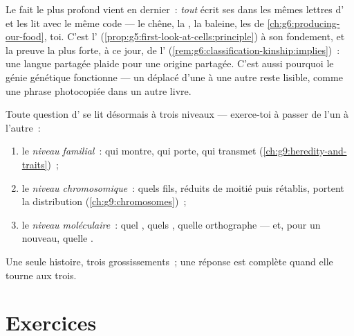 \begin{remark}\label{rem:g9:genes-and-dna:universal}
Le fait le plus profond vient en dernier~: \emph{tout}
 écrit ses  dans les mêmes lettres d' et
les lit avec le même code --- le chêne, la , la
baleine, les  de
\cref{ch:g6:producing-our-food}, toi. C'est l' (\cref{prop:g5:first-look-at-cells:principle}) à son
fondement, et la preuve la plus forte, à ce jour, de
l'
(\cref{rem:g6:classification-kinship:implies})~: une langue
partagée plaide pour une origine partagée. C'est aussi
pourquoi le génie génétique fonctionne --- un  déplacé
d'une  à une autre reste lisible, comme une phrase
photocopiée dans un autre livre.
\end{remark}

\begin{method}\label{met:g9:genes-and-dna:levels}
Toute question d' se lit désormais à trois niveaux
--- exerce-toi à passer de l'un à l'autre~:
\begin{enumerate}
  \item le \emph{niveau familial}~: qui montre, qui porte,
        qui transmet (\cref{ch:g9:heredity-and-traits})~;
  \item le \emph{niveau chromosomique}~: quels fils, réduits
        de moitié puis rétablis, portent la distribution
        (\cref{ch:g9:chromosomes})~;
  \item le \emph{niveau moléculaire}~: quel , quels
        , quelle orthographe --- et, pour un
         nouveau, quelle .
\end{enumerate}
Une seule histoire, trois grossissements~; une réponse est
complète quand elle tourne aux trois.
\end{method}

\section{Exercices}

